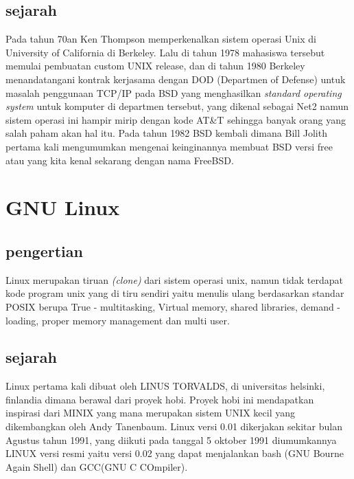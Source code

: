 \subsection{sejarah}
	Pada tahun 70an Ken Thompson memperkenalkan sistem operasi Unix di University of California di Berkeley. Lalu di tahun 1978 mahasiswa tersebut memulai pembuatan custom UNIX release, dan di tahun 1980 Berkeley menandatangani kontrak kerjasama dengan DOD (Departmen of Defense) untuk masalah penggunaan TCP/IP pada BSD yang menghasilkan \textit{standard operating system} untuk komputer di departmen tersebut, yang dikenal sebagai Net2 namun sistem operasi ini hampir mirip dengan kode AT\&T sehingga banyak orang yang salah paham akan hal itu. Pada tahun 1982 BSD kembali dimana Bill Jolith pertama kali mengumumkan mengenai keinginannya membuat BSD versi free atau yang kita kenal sekarang dengan nama FreeBSD.

\section{GNU Linux}
\subsection{pengertian}
	Linux merupakan tiruan \textit{(clone)} dari sistem operasi unix, namun tidak terdapat kode program unix yang di tiru sendiri yaitu  menulis ulang berdasarkan standar POSIX berupa True - multitasking, Virtual memory, shared libraries, demand - loading, proper memory management dan multi user.
\subsection{sejarah}
	Linux pertama kali dibuat oleh LINUS TORVALDS, di universitas helsinki, finlandia	dimana berawal dari proyek hobi. Proyek hobi ini mendapatkan inspirasi dari MINIX yang mana merupakan sistem UNIX kecil yang dikembangkan oleh Andy Tanenbaum. Linux versi 0.01 dikerjakan sekitar bulan Agustus tahun 1991, yang diikuti pada tanggal 5 oktober 1991 diumumkannya LINUX versi resmi yaitu versi 0.02 yang dapat menjalankan bash (GNU Bourne Again Shell) dan GCC(GNU C COmpiler).